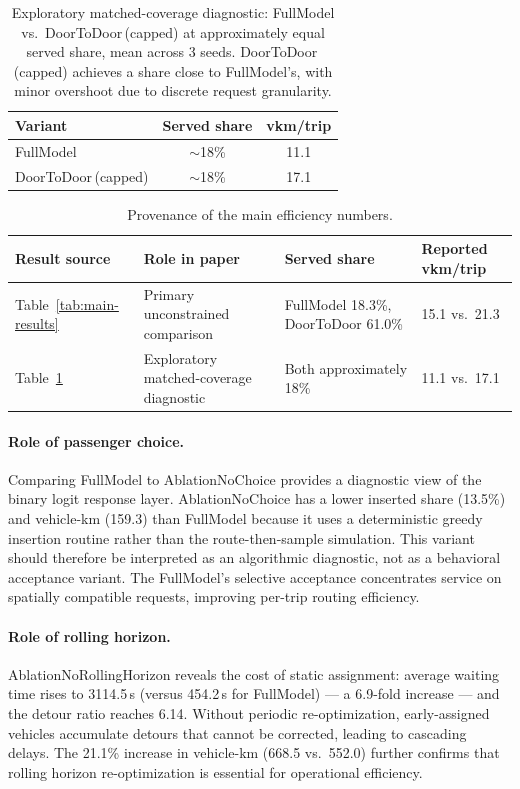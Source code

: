 \begin{table}[h]
\centering
\caption{Exploratory matched-coverage diagnostic: FullModel vs.\ DoorToDoor\,(capped)
         at approximately equal served share, mean across 3 seeds.
         DoorToDoor\,(capped) achieves a share close to FullModel's, with minor overshoot due to discrete
         request granularity.}
\label{tab:matched-coverage}
\begin{tabular}{lcc}
\toprule
Variant & Served share & vkm/trip \\
\midrule
FullModel              & $\sim$18\% & 11.1 \\
DoorToDoor\,(capped)   & $\sim$18\% & 17.1 \\
\bottomrule
\end{tabular}
\end{table}

\begin{table}[h]
\centering
\caption{Provenance of the main efficiency numbers.}
\label{tab:result-provenance}
\footnotesize
\begin{tabular}{p{2.7cm}p{4.0cm}p{3.8cm}p{2.7cm}}
\toprule
Result source & Role in paper & Served share & Reported vkm/trip \\
\midrule
Table~\ref{tab:main-results} & Primary unconstrained comparison
  & FullModel 18.3\%, DoorToDoor 61.0\% & 15.1 vs.\ 21.3 \\
Table~\ref{tab:matched-coverage} & Exploratory matched-coverage diagnostic
  & Both approximately 18\% & 11.1 vs.\ 17.1 \\
\bottomrule
\end{tabular}
\end{table}

\paragraph{Role of passenger choice.}
Comparing FullModel to AblationNoChoice provides a diagnostic view of the binary logit
response layer. AblationNoChoice has a lower inserted share (13.5\%) and vehicle-km
(159.3) than FullModel because it uses a deterministic greedy insertion routine rather
than the route-then-sample simulation. This variant should therefore be interpreted as
an algorithmic diagnostic, not as a behavioral acceptance variant.
The FullModel's selective acceptance concentrates service on spatially compatible
requests, improving per-trip routing efficiency.

\paragraph{Role of rolling horizon.}
AblationNoRollingHorizon reveals the cost of static assignment: average
waiting time rises to 3114.5\,s (versus 454.2\,s for FullModel) — a 6.9-fold
increase — and the
detour ratio reaches 6.14. Without periodic re-optimization, early-assigned
vehicles accumulate detours that cannot be corrected, leading to cascading
delays. The 21.1\% increase in vehicle-km (668.5 vs.\ 552.0) further confirms that rolling
horizon re-optimization is essential for operational efficiency.

